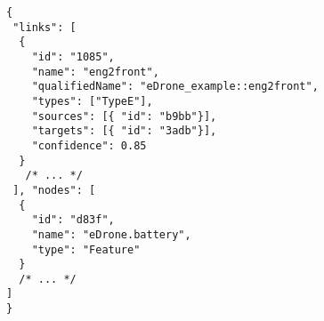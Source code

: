 \begin{center}
\begin{lstlisting}[caption={Excerpt of a trace written in Tracea-JSon.},
label=lst:traceamodel,
style=mystylesysml,
frame=shadowbox,
rulesepcolor=\color{blue},
linewidth=16.6cm,
xleftmargin=0.2cm,
morekeywords={links,id,name,type, source_id, target_id,confidence,nodes,qualifiedName,types,sources,targets}]
{
 "links": [
  { 
    "id": "1085", 
    "name": "eng2front", 
    "qualifiedName": "eDrone_example::eng2front", 
    "types": ["TypeE"], 
    "sources": [{ "id": "b9bb"}],
    "targets": [{ "id": "3adb"}], 
    "confidence": 0.85
  }
   /* ... */
 ], "nodes": [
  { 
    "id": "d83f", 
    "name": "eDrone.battery", 
    "type": "Feature"
  }
  /* ... */
]
}
\end{lstlisting}
\end{center}